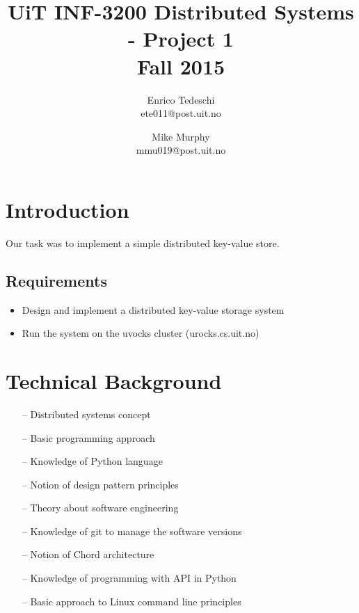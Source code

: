 \documentclass[11pt,conference]{IEEEtran}
\title{UiT INF-3200 Distributed Systems - Project 1\\Fall 2015}
\author{Enrico Tedeschi\\ete011@post.uit.no
    \and Mike Murphy\\mmu019@post.uit.no}
\begin{document}
\maketitle


\section{Introduction}

Our task was to implement a simple distributed key-value store.


\subsection{Requirements}



\begin{itemize} 
\item Design and implement a distributed key-value storage system
\item Run the system on the uvocks cluster (urocks.cs.uit.no)
\end{itemize}

\fi


\section{Technical Background}


\begin{itemize} 
\item[--] Distributed systems concept
\item[--] Basic programming approach
\item[--] Knowledge of Python language
\item[--] Notion of design pattern principles
\item[--] Theory about software engineering
\item[--] Knowledge of git to manage the software versions
\item[--] Notion of Chord architecture
\item[--] Knowledge of programming with API in Python
\item[--] Basic approach to Linux command line principles
\end{itemize}

\fi
\end{document}
